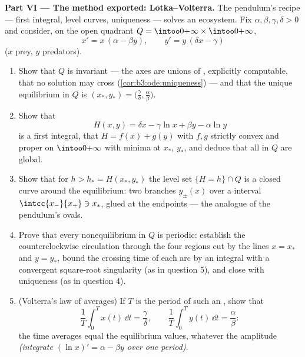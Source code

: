 \begin{problem}
\medskip
\noindent\textbf{Part VI --- The method exported:
Lotka--Volterra.} The pendulum's recipe --- first integral,
 level curves, uniqueness --- solves an ecosystem.
Fix $\alpha, \beta, \gamma, \delta > 0$ and consider, on the
open quadrant $Q = \intoo0{+\infty}\times\intoo0{+\infty}$,
\[
x' = x\,(\alpha - \beta y), \qquad
y' = y\,(\delta x - \gamma)
\]
($x$ prey, $y$ predators).
\begin{enumerate}[resume]
  \item Show that $Q$ is invariant --- the axes are unions
        of , explicitly computable, that no solution
        may cross (\cref{cor:b3:ode:uniqueness}) --- and
        that the unique equilibrium in $Q$ is $(x_*, y_*) =
        \bigl(\frac\gamma\delta, \frac\alpha\beta\bigr)$.
  \item Show that
        \[
        H(x, y) = \delta x - \gamma\ln x + \beta y -
        \alpha\ln y
        \]
        is a first integral, that $H = f(x) + g(y)$ with
        $f, g$ strictly convex and proper on
        $\intoo0{+\infty}$ with minima at $x_*$, $y_*$, and
        deduce that all  in $Q$ are global.
  \item Show that for $h > h_* = H(x_*, y_*)$ the level set
        $\{H = h\}\cap Q$ is a closed curve around the
        equilibrium: two  branches $y_\pm(x)$ over
        a  interval $\intcc{x_-}{x_+} \ni x_*$, glued
        at the endpoints --- the analogue of the pendulum's
        ovals.
  \item Prove that every nonequilibrium  in $Q$ is
        periodic: establish the counterclockwise circulation
        through the four regions cut by the lines $x = x_*$
        and $y = y_*$, bound the crossing time of each arc
        by an integral with a convergent square-root
        singularity (as in question 5), and close with
        uniqueness (as in question 4).
  \item (Volterra's law of averages) If $T$ is the period
        of such an , show that
        \[
        \frac1T\int_0^Tx(t)\,\dd t = \frac\gamma\delta,
        \qquad
        \frac1T\int_0^Ty(t)\,\dd t = \frac\alpha\beta :
        \]
        the time averages equal the equilibrium values,
        whatever the amplitude \emph{(integrate $(\ln x)' =
        \alpha - \beta y$ over one period)}.

\end{enumerate}
\end{problem}
